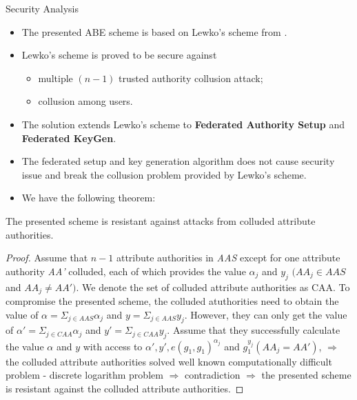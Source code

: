 \documentclass[11pt]{beamer}
\begin{document}
\begin{frame}[allowframebreaks]{Security Analysis}

\begin{itemize}
\item The presented ABE scheme is based on Lewko's scheme from \cite{lewkowaters}.
\item Lewko's scheme is proved to be secure against
	\begin{itemize}
	\item multiple $(n - 1)$ trusted authority collusion attack;
	\item collusion among users.
	\end{itemize}
\item The solution extends Lewko's scheme to \textbf{Federated Authority Setup} and \textbf{Federated KeyGen}.
\item The federated setup and key generation algorithm does not cause security issue and break the collusion problem provided by Lewko's scheme.
\item We have the following theorem:
\end{itemize}
\begin{theorem}
The presented scheme is resistant against attacks from colluded attribute authorities.
\end{theorem}
\framebreak
\begin{proof}
Assume that $n - 1$ attribute authorities in \textit{AAS} except for one attribute authority \textit{AA'} colluded, each of which provides the value $\alpha_j$ and $y_j$ $(AA_j \in AAS$ and $AA_j \not = AA')$. We denote the set of colluded attribute authorities as CAA. To compromise the presented scheme, the colluded atuthorities need to obtain the value of $\alpha = \Sigma_{j\in AAS}\alpha_j$ and $y = \Sigma_{j \in AAS}y_j$. However, they can only get the value of $\alpha' = \Sigma_{j \in CAA} \alpha_j$ and $y' = \Sigma_{j \in CAA}y_j$. Assume that they successfully calculate the value $\alpha$ and $y$ with access to $\alpha', y', e(g_1,g_1)^{\alpha_j}$ and $g_1^{y_j}(AA_j = AA')$, $\Rightarrow$ the colluded attribute authorities solved well known computationally difficult problem - discrete logarithm problem $\Rightarrow$ contradiction $\Rightarrow$ the presented scheme is resistant against the colluded attribute authorities.
\end{proof}

\end{frame}
\end{document}

